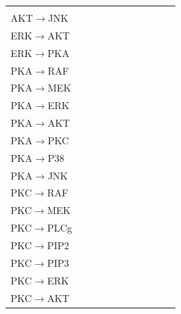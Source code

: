 \documentclass[a4paper,pdf]{article}
\newcommand{\cmark}{\color{green}{\ding{51}}}%
\begin{document}
\begin{table}[!ht]
{{\begin{tabular}{l|ccccc|ccccc}
 & &\\
AKT$\to$JNK   & 		   &  		   &  		   & 
            &         &            &  		    &
\cmark& \cmark &\\
ERK$\to$AKT   &             & \cmark &         & 
\cmark 	 & \cmark & \cmark &				&
& \cmark  & \cmark \\
ERK$\to$PKA   &              &          &          & 
\cmark   &    		 &            	&            &
 & &\\
PKA$\to$RAF   & \cmark    & \cmark &          &
            &          &              &   \cmark &    
\cmark& \cmark &\\
PKA$\to$MEK   & \cmark    & \cmark & \cmark & 
\cmark  &           & \cmark    &  \cmark &
\cmark& &\\
PKA$\to$ERK   & \cmark     & \cmark &          &
          & \cmark &               &  \cmark &
\cmark& \cmark  & \cmark\\
PKA$\to$AKT   & \cmark    & \cmark & \cmark &
\cmark &            & \cmark    &  \cmark &
\cmark& \cmark  & \cmark\\
PKA$\to$PKC   &              &           &           & 
\cmark &            &             &			&
& \cmark &\\
PKA$\to$P38   & \cmark 	  & \cmark  & \cmark &
          &            &             & \cmark &
\cmark& \cmark &\\
PKA$\to$JNK   & \cmark 	  & \cmark  & \cmark &
\cmark &            &             & \cmark &
\cmark& \cmark &\\
PKC$\to$RAF    & \cmark   & \cmark & \cmark  & 
         &              &            &\cmark & 
\cmark& &\\
PKC$\to$MEK   & \cmark & \cmark & \cmark &
\cmark &          &           &  \cmark & 
\cmark& &\\
PKC$\to$PLCg  &              &              & \cmark  &     
         &              &              &\cmark & 
\cmark&  & \cmark\\
PKC$\to$PIP2  &              &              & \cmark  &
         &              &              &  \cmark &          
\cmark&  & \cmark\\
PKC$\to$PIP3   &              &           &           & 
 		&            &             &			&
\cmark& &\\
PKC$\to$ERK   &              &              &   	      & 
       &              &               & \cmark &
\cmark& &\\
PKC$\to$AKT   &              &              & \cmark & 
       &              &               & \cmark &

\end{tabular}}}
\end{table}
\end{document}
